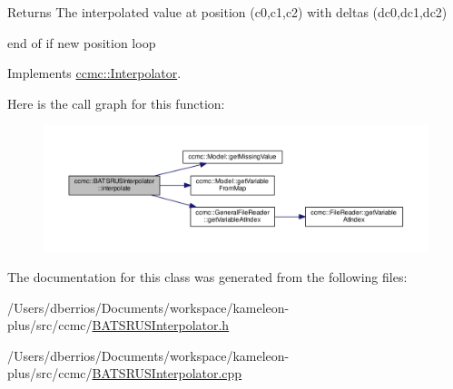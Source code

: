 \begin{DoxyReturn}{Returns}
The interpolated value at position (c0,c1,c2) with deltas (dc0,dc1,dc2) 
\end{DoxyReturn}
end of if new position loop 

Implements \hyperlink{classccmc_1_1_interpolator_aa6b272bd53630020d92938ec1e5cfad9}{ccmc\-::\-Interpolator}.



Here is the call graph for this function\-:
\nopagebreak
\begin{figure}[H]
\begin{center}
\leavevmode
\includegraphics[width=350pt]{classccmc_1_1_b_a_t_s_r_u_s_interpolator_a8bb4e9b10064a516192c771462673b09_cgraph}
\end{center}
\end{figure}




The documentation for this class was generated from the following files\-:\begin{DoxyCompactItemize}
\item 
/\-Users/dberrios/\-Documents/workspace/kameleon-\/plus/src/ccmc/\hyperlink{_b_a_t_s_r_u_s_interpolator_8h}{B\-A\-T\-S\-R\-U\-S\-Interpolator.\-h}\item 
/\-Users/dberrios/\-Documents/workspace/kameleon-\/plus/src/ccmc/\hyperlink{_b_a_t_s_r_u_s_interpolator_8cpp}{B\-A\-T\-S\-R\-U\-S\-Interpolator.\-cpp}\end{DoxyCompactItemize}
